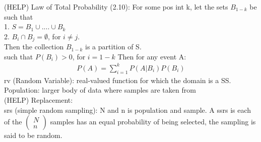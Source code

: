 \documentclass[12pt]{article}
\begin{document}
	(HELP) Law of Total Probability (2.10): For some pos int k, let the sets $ B_{1-k} $ be
	such that \\
	1. $ S = B_1 \cup .... \cup B_k $ \\
	2. $ B_i \cap B_j = \emptyset  $, for $ i \ne j $. \\
	Then the collection $ B_{1-k} $ is a partition of S. \\
	such that $ P(B_i) > 0 $, for $ i = 1-k $ Then for any event A:
	\begin{align*}
		P(A) = \sum_{i=1}^k P(A|B_i)P(B_i)
	\end{align*}
	rv (Random Variable): real-valued function for which the domain is a SS. \\
	Population: larger body of data where samples are taken from \\
	(HELP) Replacement: \\
	srs (simple random sampling): N and n is population and sample. A ssrs is 
	each of the $ \begin{pmatrix} N \\ n \end{pmatrix} $ samples has an equal probability of 
	being selected, the sampling is said to be random. 
\end{document}
